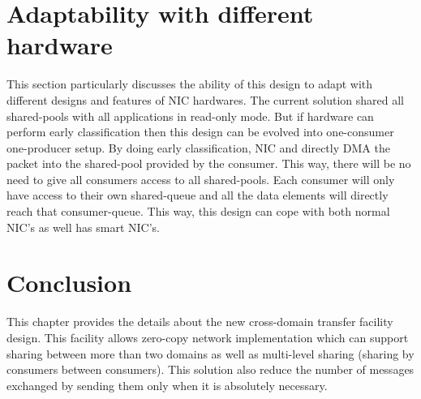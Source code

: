 \documentclass[a4paper,twoside]{report} %
\begin{document}
\section{Adaptability with different hardware}
This section particularly discusses the ability of this design to
adapt with different designs and features of NIC hardwares.  The
current solution shared all shared-pools with all applications in 
read-only mode.  But if hardware can perform early classification then
this design can be evolved into one-consumer one-producer setup.  By
doing early classification, NIC and directly DMA the packet into the
shared-pool provided by the consumer.  This way, there will be no need
to give all consumers access to all shared-pools.  Each consumer will
only have access to their own shared-queue and all the data elements
will directly reach that consumer-queue.  This way, this design can
cope with both normal NIC's as well has smart NIC's.

\section{Conclusion}
This chapter provides the details about the new cross-domain transfer
facility design.  This facility allows zero-copy network
implementation which can support sharing between more than two domains
as well as multi-level sharing (sharing by consumers between
consumers).  This solution also reduce the number of messages
exchanged by sending them only when it is absolutely necessary.
\end{document}
